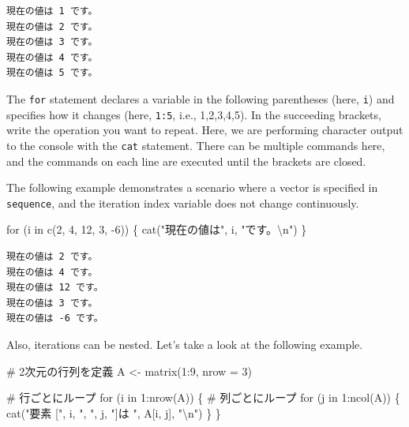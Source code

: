 \documentclass[
  a4paper,
]{book}
\newenvironment{Shaded}{\begin{snugshade}}{\end{snugshade}}
\newcommand{\AttributeTok}[1]{\textcolor[rgb]{0.40,0.45,0.13}{#1}}
\newcommand{\CommentTok}[1]{\textcolor[rgb]{0.37,0.37,0.37}{#1}}
\newcommand{\ControlFlowTok}[1]{\textcolor[rgb]{0.00,0.23,0.31}{#1}}
\newcommand{\DecValTok}[1]{\textcolor[rgb]{0.68,0.00,0.00}{#1}}
\newcommand{\FunctionTok}[1]{\textcolor[rgb]{0.28,0.35,0.67}{#1}}
\newcommand{\NormalTok}[1]{\textcolor[rgb]{0.00,0.23,0.31}{#1}}
\newcommand{\OtherTok}[1]{\textcolor[rgb]{0.00,0.23,0.31}{#1}}
\newcommand{\SpecialCharTok}[1]{\textcolor[rgb]{0.37,0.37,0.37}{#1}}
\newcommand{\StringTok}[1]{\textcolor[rgb]{0.13,0.47,0.30}{#1}}
\begin{document}
\begin{verbatim}
現在の値は 1 です。
現在の値は 2 です。
現在の値は 3 です。
現在の値は 4 です。
現在の値は 5 です。
\end{verbatim}

The \texttt{for} statement declares a variable in the following
parentheses (here, \texttt{i}) and specifies how it changes (here,
\texttt{1:5}, i.e., 1,2,3,4,5). In the succeeding brackets, write the
operation you want to repeat. Here, we are performing character output
to the console with the \texttt{cat} statement. There can be multiple
commands here, and the commands on each line are executed until the
brackets are closed.

The following example demonstrates a scenario where a vector is
specified in \texttt{sequence}, and the iteration index variable does
not change continuously.

\begin{Shaded}
\begin{Highlighting}[]
\ControlFlowTok{for}\NormalTok{ (i }\ControlFlowTok{in} \FunctionTok{c}\NormalTok{(}\DecValTok{2}\NormalTok{, }\DecValTok{4}\NormalTok{, }\DecValTok{12}\NormalTok{, }\DecValTok{3}\NormalTok{, }\SpecialCharTok{{-}}\DecValTok{6}\NormalTok{)) \{}
  \FunctionTok{cat}\NormalTok{(}\StringTok{"現在の値は"}\NormalTok{, i, }\StringTok{"です。}\SpecialCharTok{\textbackslash{}n}\StringTok{"}\NormalTok{)}
\NormalTok{\}}
\end{Highlighting}
\end{Shaded}

\begin{verbatim}
現在の値は 2 です。
現在の値は 4 です。
現在の値は 12 です。
現在の値は 3 です。
現在の値は -6 です。
\end{verbatim}

Also, iterations can be nested. Let's take a look at the following
example.

\begin{Shaded}
\begin{Highlighting}[]
\CommentTok{\# 2次元の行列を定義}
\NormalTok{A }\OtherTok{\textless{}{-}} \FunctionTok{matrix}\NormalTok{(}\DecValTok{1}\SpecialCharTok{:}\DecValTok{9}\NormalTok{, }\AttributeTok{nrow =} \DecValTok{3}\NormalTok{)}

\CommentTok{\# 行ごとにループ}
\ControlFlowTok{for}\NormalTok{ (i }\ControlFlowTok{in} \DecValTok{1}\SpecialCharTok{:}\FunctionTok{nrow}\NormalTok{(A)) \{}
  \CommentTok{\# 列ごとにループ}
  \ControlFlowTok{for}\NormalTok{ (j }\ControlFlowTok{in} \DecValTok{1}\SpecialCharTok{:}\FunctionTok{ncol}\NormalTok{(A)) \{}
    \FunctionTok{cat}\NormalTok{(}\StringTok{"要素 ["}\NormalTok{, i, }\StringTok{", "}\NormalTok{, j, }\StringTok{"]は "}\NormalTok{, A[i, j], }\StringTok{"}\SpecialCharTok{\textbackslash{}n}\StringTok{"}\NormalTok{)}
\NormalTok{  \}}
\NormalTok{\}}
\end{Highlighting}
\end{Shaded}
\end{document}
